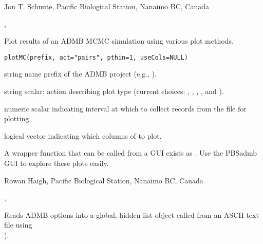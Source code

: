 \documentclass[letterpaper]{book}
\begin{document}
%
\begin{Author}\relax
 Jon T. Schnute, Pacific Biological Station, Nanaimo BC, Canada 
\end{Author}
%
\begin{SeeAlso}\relax
 ,   
\end{SeeAlso}
%
\begin{Description}\relax
Plot results of an ADMB MCMC simulation using various plot methods.
\end{Description}
%
\begin{Usage}
\begin{verbatim}
plotMC(prefix, act="pairs", pthin=1, useCols=NULL)
\end{verbatim}
\end{Usage}
%
\begin{Arguments}
\begin{ldescription}
\item[\code{prefix}] string name prefix of the ADMB project (e.g., ).
\item[\code{act}] string scalar: action describing plot type (current choices:
, , , , and
).
\item[\code{pthin}] numeric scalar indicating interval at which to collect records
from the  file for plotting.
\item[\code{useCols}] logical vector indicating which columns of  to plot.
\end{ldescription}
\end{Arguments}
%
\begin{Note}\relax
A wrapper function that can be called from a GUI exists as .
Use the PBSadmb GUI to explore these plots easily.
\end{Note}
%
\begin{Author}\relax
 Rowan Haigh, Pacific Biological Station, Nanaimo BC, Canada 
\end{Author}
%
\begin{SeeAlso}\relax
{}, 
\end{SeeAlso}
%
\begin{Description}\relax
Reads ADMB options into a global, hidden list object 
called  from an ASCII text file using \\{}
).
\end{Description}
\end{document}
